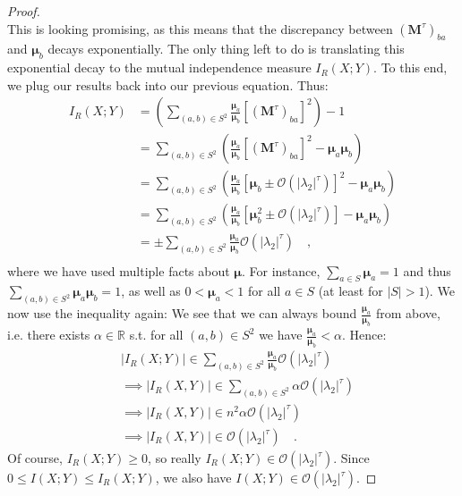 \documentclass[../../main.tex]{subfiles}
\begin{document}
\begin{proof}
    ~\\
    This is looking promising, as this means that the discrepancy between $(\boldsymbol{M}^\tau)_{ba}$ and $\boldsymbol{\mu}_b$ decays exponentially. The only thing left to do is translating this exponential decay to the mutual independence measure $I_R(X; Y)$. To this end, we plug our results back into our previous equation. Thus:
    \begin{align*}
        I_R(X; Y) &= \left( \sum_{(a,b) \in S^2} \frac{\boldsymbol{\mu}_a}{\boldsymbol{\mu}_b} \left[ (\boldsymbol{M}^{\tau})_{ba} \right] ^2 \right) - 1 \\
        &= \sum_{(a,b) \in S^2} \left( \frac{\boldsymbol{\mu}_a}{\boldsymbol{\mu}_b} \left[ (\boldsymbol{M}^{\tau})_{ba} \right] ^2 - \boldsymbol{\mu}_a \boldsymbol{\mu}_b \right) \\
        &= \sum_{(a,b) \in S^2} \left( \frac{\boldsymbol{\mu}_a}{\boldsymbol{\mu}_b} \left[ \boldsymbol{\mu}_b \pm \mathcal{O}(|\lambda_2|^\tau) \right] ^2 - \boldsymbol{\mu}_a \boldsymbol{\mu}_b \right) \\
        &= \sum_{(a,b) \in S^2} \left( \frac{\boldsymbol{\mu}_a}{\boldsymbol{\mu}_b} \left[ \boldsymbol{\mu}_b^2 \pm \mathcal{O}(|\lambda_2|^\tau) \right] - \boldsymbol{\mu}_a \boldsymbol{\mu}_b \right) \\
        &= \pm \sum_{(a,b) \in S^2} \frac{\boldsymbol{\mu}_a}{\boldsymbol{\mu}_b} \mathcal{O}(|\lambda_2|^\tau) \quad , \\
    \end{align*}
    where we have used multiple facts about $\boldsymbol{\mu}$. For instance, $\sum_{a \in S} \boldsymbol{\mu}_a = 1$ and thus $\sum_{(a,b) \in S^2} \boldsymbol{\mu}_a \boldsymbol{\mu}_b = 1$, as well as $0 < \boldsymbol{\mu}_a < 1$ for all $a \in S$ (at least for $|S| > 1$). We now use the inequality again: We see that we can always bound $\frac{\boldsymbol{\mu}_a}{\boldsymbol{\mu}_b}$ from above, i.e. there exists $\alpha \in \mathbb{R}$ s.t. for all $(a,b) \in S^2$ we have $\frac{\boldsymbol{\mu}_a}{\boldsymbol{\mu}_b} < \alpha$. Hence:
    \begin{align*}
        &|I_R(X; Y)| \in \sum_{(a,b) \in S^2} \frac{\boldsymbol{\mu}_a}{\boldsymbol{\mu}_b} \mathcal{O}(|\lambda_2|^\tau) \\
        &\implies |I_R(X, Y)| \in \sum_{(a,b) \in S^2} \alpha \mathcal{O}(|\lambda_2|^\tau) \\
        &\implies |I_R(X, Y)| \in n^2 \alpha \mathcal{O}(|\lambda_2|^\tau) \\
        &\implies |I_R(X, Y)| \in \mathcal{O}(|\lambda_2|^\tau) \quad .
    \end{align*}
    Of course, $I_R(X; Y) \geq 0$, so really $I_R(X; Y) \in \mathcal{O}(|\lambda_2|^\tau)$. Since $0 \leq I(X; Y) \leq I_R(X; Y)$, we also have $I(X; Y) \in \mathcal{O}(|\lambda_2|^\tau)$.
    \end{proof}
\end{document}
